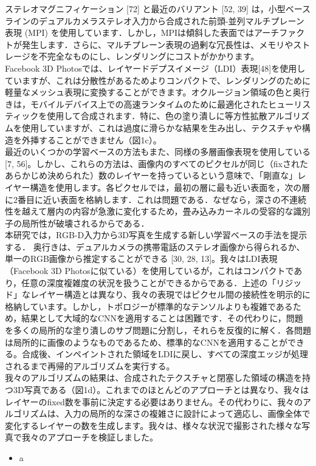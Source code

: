 \documentclass[a4paper,10pt,titlepage]{jsarticle}
\begin{document}
ステレオマグニフィケーション [72] と最近のバリアント [52, 39] は，小型ベースラインのデュアルカメラステレオ入力から合成された前頭-並列マルチプレーン表現 (MPI) を使用しています．しかし，MPIは傾斜した表面ではアーチファクトが発生します．さらに、マルチプレーン表現の過剰な冗長性は、メモリやストレージを不完全なものにし、レンダリングにコストがかかります。\\

Facebook 3D Photosでは、レイヤードデプスイメージ（LDI）表現[48]を使用していますが、これは分散性があるためよりコンパクトで、レンダリングのために軽量なメッシュ表現に変換することができます。オクルージョン領域の色と奥行きは，モバイルデバイス上での高速ランタイムのために最適化されたヒューリスティックを使用して合成されます．特に、色の塗り潰しに等方性拡散アルゴリズムを使用していますが、これは過度に滑らかな結果を生み出し、テクスチャや構造を外挿することができません（図1c）。\\

最近のいくつかの学習ベースの方法もまた、同様の多層画像表現を使用している[7, 56]。しかし、これらの方法は、画像内のすべてのピクセルが同じ（ﬁxされたあらかじめ決められた）数のレイヤーを持っているという意味で、「剛直な」レイヤー構造を使用します。各ピクセルでは，最初の層に最も近い表面を，次の層に2番目に近い表面を格納します．これは問題である．なぜなら，深さの不連続性を越えて層内の内容が急激に変化するため，畳み込みカーネルの受容的な識別子の局所性が破壊されるからである．\\

本研究では，RGB-D入力から3D写真を生成する新しい学習ベースの手法を提示する．
 奥行きは、デュアルカメラの携帯電話のステレオ画像から得られるか、単一のRGB画像から推定することができる [30, 28, 13]。我々はLDI表現（Facebook 3D Photosに似ている）を使用しているが，これはコンパクトであり，任意の深度複雑度の状況を扱うことができるからである．上述の「リジッド」なレイヤー構造とは異なり、我々の表現ではピクセル間の接続性を明示的に格納しています。しかし，トポロジーが標準的なテンソルよりも複雑であるため，結果として大域的なCNNを適用することは困難です．その代わりに，問題を多くの局所的な塗り潰しのサブ問題に分割し，それらを反復的に解く．各問題は局所的に画像のようなものであるため、標準的なCNNを適用することができる。合成後、インペイントされた領域をLDIに戻し、すべての深度エッジが処理されるまで再帰的アルゴリズムを実行する。\\

我々のアルゴリズムの結果は、合成されたテクスチャと閉塞した領域の構造を持つ3D写真である（図1d）。これまでのほとんどのアプローチとは異なり、我々はレイヤーのﬁxed数を事前に決定する必要はありません。その代わりに、我々のアルゴリズムは、入力の局所的な深さの複雑さに設計によって適応し、画像全体で変化するレイヤーの数を生成します。我々は、様々な状況で撮影された様々な写真で我々のアプローチを検証しました。\\

\begin{itemize}
  \item a
\end{itemize}


\begin{thebibliography}{99}
\end{thebibliography}
\end{document}
